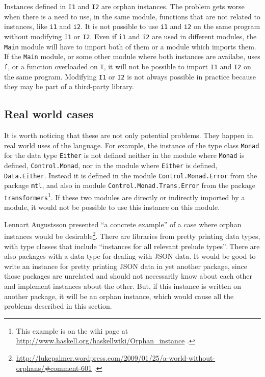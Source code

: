 \documentclass[msc]{ppgccufmg}
\begin{document}
Instances defined in \texttt{I1} and \texttt{I2} are orphan instances.
The problem gets worse when there is a need to use, in the same
module, functions that are not related to instances, like \texttt{i1}
and \texttt{i2}.  It is not possible to use \texttt{i1} and \texttt{i2} on
the same program without modifying \texttt{I1} or \texttt{I2}. Even if \texttt{i1}
and \texttt{i2} are used in different modules, the \texttt{Main} module will
have to import both of them or a module which imports them.  If the
\texttt{Main} module, or some other module where both instances are availabe,
uses \texttt{f}, or a function overloaded on \texttt{T}, it will not be possible
to import \texttt{I1} and \texttt{I2} on the same program.  Modifying
\texttt{I1} or \texttt{I2} is not always possible in practice because they
may be part of a third-party library.

\subsection{Real world cases}

It is worth noticing that these are not only potential problems.
They happen in real world uses of the language.
For example, the instance of the type class \texttt{Monad} for the data type \texttt{Either} is not defined neither in the module where \texttt{Monad} is defined, \texttt{Control.Monad}, nor in the module where \texttt{Either} is defined, \texttt{Data.Either}.
Instead it is defined in the module \texttt{Control.Monad.Error} from the package \texttt{mtl}, and also in module \texttt{Control.Monad.Trans.Error} from the package \texttt{transformers}\footnote{This example is on the wiki page at \url{http://www.haskell.org/haskellwiki/Orphan_instance} .}.
If these two modules are directly or indirectly imported by a module, it would not be possible to use this instance on this module.

Lennart Augustsson presented ``a concrete example'' of a case where orphan instances would be desirable\footnote{\url{http://lukepalmer.wordpress.com/2009/01/25/a-world-without-orphans/\#comment-601} .}.
There are libraries from pretty printing data types, with type classes that include ``instances for all relevant prelude types''.
There are also packages with a data type for dealing with JSON data.
It would be good to write an instance for pretty printing JSON data in yet another package, since those packages are unrelated and should not necessarily know about each other and implement instances about the other.
But, if this instance is written on another package, it will be an orphan instance, which would cause all the problems described in this section.
\end{document}
